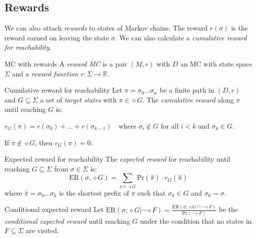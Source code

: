 \documentclass[english]{panikzettel}
\renewcommand{\Pr}{\mathrm{Pr}}
\newcommand{\ER}{\mathrm{ER}}
\newcommand{\rel}{\mathbb{R}}
\begin{document}
\subsection{Rewards}

\begin{halfboxl}
	We can also attach \emph{rewards} to states of Markov chains.
	The reward $r(\sigma)$ is the reward earned on leaving the state $\sigma$.
	We can also calculate a \emph{cumulative reward for reachability}.
\end{halfboxl}%
\begin{halfboxr}
	\vspace{-\baselineskip}
	\begin{defi}{MC with rewards}
		A \emph{reward MC} is a pair $(M,r)$ with $D$ an MC with state space $\Sigma$ and a \emph{reward function} $r : \Sigma \to \rel$.
	\end{defi}
\end{halfboxr}

\begin{defi}{Cumulative reward for reachability}
	Let $\pi = \sigma_0 \ldots \sigma_n$ be a finite path in $(D, r)$ and $G \subseteq \Sigma$ a set of \emph{target states} with $\pi \in \diamond G$.
	The \emph{cumulative reward} along $\pi$ until reaching $G$ is:
	\begin{tightcenter}$
			r_G(\pi) = r(\sigma_0) + \ldots + r(\sigma_{k-1}) \quad \text{where } \sigma_i \notin G \text{ for all } i < k \text{ and } \sigma_k \in G.
		$\end{tightcenter}

	If $\pi \notin \diamond G$, then $r_G(\pi) = 0$.
\end{defi}

\begin{defi}{Expected reward for reachability}
	The \emph{expected reward} for reachability until reaching $G \subseteq \Sigma$ from $\sigma \in \Sigma$ is:
	\[
		\ER(\sigma, \diamond G) = \sum_{\pi \models \diamond G} \Pr(\hat{\pi}) \cdot r_G(\hat{\pi})
	\]
	where $\hat{\pi} = \sigma_0 \ldots \sigma_k$ is the shortest prefix of $\pi$ such that $\sigma_k \in G$ and $\sigma_0 = \sigma$.
\end{defi}

\begin{defi}{Conditional expected reward}
	Let $\ER(\sigma, \diamond G | \neg \diamond F)=\frac{\ER(\sigma, \diamond G \cap \neg \diamond F)}{\Pr(\neg \diamond F)}$ be the \emph{conditional expected reward} until reaching $G$ under the condition that no states in $F \subseteq \Sigma$ are visited.
\end{defi}
\end{document}

